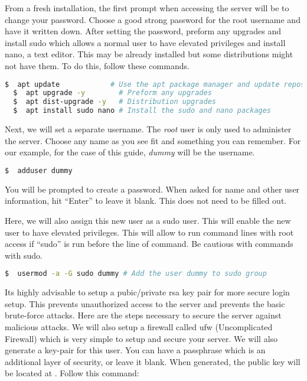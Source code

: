 \noindent
From a fresh installation, the first prompt when accessing the server will be to change your password. Choose a good strong password for the root username and have it written down.  After setting the password, preform any upgrades and install sudo which allows a normal user to have elevated privileges and install nano, a text editor. This may be already installed but some distributions might not have them. To do this, follow these commands.

\begin{lstlisting}[language=bash]
  $  apt update            # Use the apt package manager and update repository
  $  apt upgrade -y        # Preform any upgrades
  $  apt dist-upgrade -y   # Distribution upgrades
  $  apt install sudo nano # Install the sudo and nano packages
\end{lstlisting}

\noindent
Next, we will set a separate username. The \emph{root} user is only used to administer the server.  Choose any name as you see fit and something you can remember. For our example, for the case of this guide, \emph{dummy} will be the username.

\begin{lstlisting}[language=bash]
  $  adduser dummy
\end{lstlisting}

\noindent
You will be prompted to create a password. When asked for name and other user information, hit ``Enter'' to leave it blank. This does not need to be filled out.


\noindent Here, we will also assign this new user as a sudo user. This will enable the new user to have elevated privileges. This will allow to run command lines with root access if ``sudo'' is run before the line of command. Be cautious with commands with sudo.

\begin{lstlisting}[language=bash]
  $  usermod -a -G sudo dummy # Add the user dummy to sudo group
\end{lstlisting}







\noindent
Its highly advisable to setup a pubic/private \gls{rsa} key pair for more secure login setup. This prevents unauthorized access to the server and prevents the basic brute-force attacks. Here are the steps necessary to secure the server against malicious attacks. We will also setup a firewall called ufw (Uncomplicated Firewall) which is very simple to setup and secure your server. We will also generate a key-pair for this user. You can have a passphrase which is an additional layer of security, or leave it blank. When generated, the public key will be located at . Follow this command:

